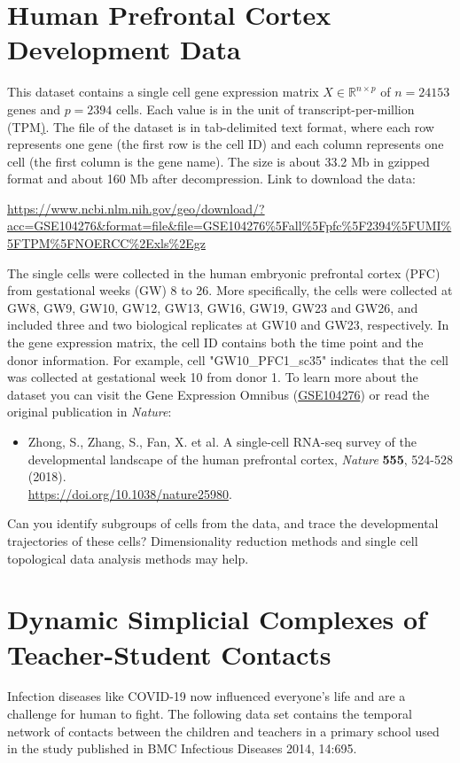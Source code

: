 \documentclass[11pt]{article}
\def\R{{\mathbb R}}
\begin{document}
\section{Human Prefrontal Cortex Development Data}
This dataset contains a single cell gene expression matrix $X\in \R^{n\times p}$ of $n=24153$ genes and $p=2394$ cells. Each value is in the unit of transcript-per-million ({TPM}\href{https://www.rna-seqblog.com/rpkm-fpkm-and-tpm-clearly-explained/}). The file of the dataset is in tab-delimited text format, where each row represents one gene (the first row is the cell ID) and each column represents one cell (the first column is the gene name). The size is about 33.2 Mb in gzipped format and about 160 Mb after decompression. Link to download the data:

\url{https://www.ncbi.nlm.nih.gov/geo/download/?acc=GSE104276&format=file&file=GSE104276%5Fall%5Fpfc%5F2394%5FUMI%5FTPM%5FNOERCC%2Exls%2Egz}

The single cells were collected in the human embryonic prefrontal cortex (PFC) from gestational weeks (GW) 8 to 26. More specifically, the cells were collected at GW8, GW9, GW10, GW12, GW13, GW16, GW19, GW23 and GW26, and included three and two biological replicates at GW10 and GW23, respectively. In the gene expression matrix, the cell ID contains both the time point and the donor information. For example, cell "GW10\_PFC1\_sc35" indicates that the cell was collected at gestational week 10 from donor 1. To learn more about the dataset you can visit the Gene Expression Omnibus (\href{https://www.ncbi.nlm.nih.gov/geo/query/acc.cgi?acc=GSE104276}{GSE104276}) or read the original publication in \textit{Nature}:

\begin{itemize}
\item 
Zhong, S., Zhang, S., Fan, X. et al. A single-cell RNA-seq survey of the developmental landscape of the human prefrontal cortex, \emph{Nature} {\bf 555}, 524-528 (2018). \\
\href{https://www.nature.com/articles/nature25980}{https://doi.org/10.1038/nature25980}.
\end{itemize}

Can you identify subgroups of cells from the data, and trace the developmental trajectories of these cells? Dimensionality reduction methods and single cell topological data analysis methods may help.


\section{Dynamic Simplicial Complexes of Teacher-Student Contacts}
Infection diseases like COVID-19 now influenced everyone's life and are a challenge for human to fight. The following data set contains the temporal network of contacts between the children and teachers in a primary school used in the study published in BMC Infectious Diseases 2014, 14:695. 
\end{document}
